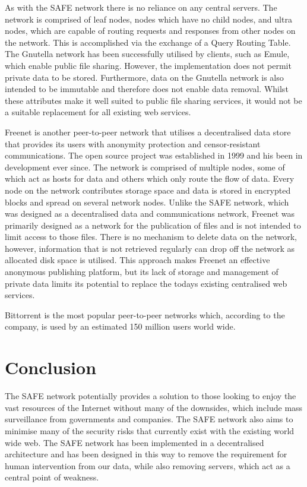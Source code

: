 \documentclass[twocolumn,english]{article}
\begin{document}
As with the SAFE network there is no
reliance on any central servers. The network is comprised of leaf nodes, nodes which have no child nodes, and ultra nodes, which are capable of routing requests and responses
from other nodes on the network.  This is accomplished via the exchange of a Query Routing Table. 
The Gnutella network has been successfully utilised by clients, such as Emule, which enable public file sharing. However, the implementation does not permit private data to be stored. 
Furthermore, data on the Gnutella network is also intended to be immutable and therefore does not enable data removal. Whilst these attributes make it well suited to public file
sharing services, it would not be a suitable replacement for all existing web services.

Freenet is another peer-to-peer network that utilises a decentralised data store that provides its users with anonymity protection and censor-resistant communications. The open source
project was established in 1999 and his been in development ever since. The network is comprised of multiple nodes, some of which act as hosts for data and others which only route the 
flow of data. Every node on the network contributes storage space and data is stored in encrypted blocks and spread on several network nodes. 
Unlike the SAFE network, which was designed as a decentralised data and communications network, Freenet was primarily designed as a network for the publication of files and is not 
intended to limit access to those files. There is no mechanism to delete data on the network, however, information that is not retrieved regularly can drop off the network as allocated disk 
space is utilised. This approach makes Freenet an effective anonymous publishing platform, but its lack of storage and management of private data limits its potential to replace the todays
existing centralised web services. 

Bittorrent is the most popular peer-to-peer networks which, according to the company, is used by an estimated 150 million users world wide.

\section*{Conclusion}

The SAFE network potentially provides a solution to those looking
to enjoy the vast resources of the Internet without many of the downsides,
which include mass surveillance from governments and companies. The SAFE
network also aims to minimise many of the security risks that currently
exist with the existing world wide web. The SAFE network has been implemented
in a decentralised architecture and has been designed in this way
to remove the requirement for human intervention from our data, while
also removing servers, which act as a central point of weakness.
\end{document}
